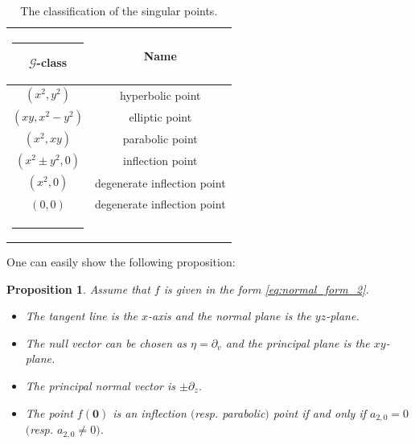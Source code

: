 \documentclass[12pt]{amsart}
\makeatletter
\theoremstyle{plain}
\newtheorem{proposition}[theorem]{Proposition}
\theoremstyle{definition}
\def\Bline{%
\noalign{\ifnum0=`}\fi\hrule \@height 1pt \futurelet
\reserved@a\@xhline}
\makeatother
\begin{document}
\begin{table}[ht!]
\centering
\caption{The classification of the singular points.}
\begin{tabular}{cc}
\Bline
$\mathcal{G}$-class & Name \\\hline
$(x^2,y^2)$ & hyperbolic point\\
$(x y,x^2-y^2)$ & elliptic point\\
$(x^2,x y)$ & parabolic point\\
$(x^2\pm y^2,0)$ & inflection point\\
$(x^2,0)$ & degenerate inflection point\\
$(0,0)$ & degenerate inflection point\\\Bline
\end{tabular}
\label{tab:singular_point}
\end{table}

 
One can easily show the following proposition:
\begin{proposition}
\label{prop:properties_of_normal_form} 
Assume that $f$ is given in the form \eqref{eq:normal_form_2}.
\begin{itemize}
\item 
The tangent line is the $x$-axis and the normal plane is the $y z$-plane. 

\item 
The null vector can be chosen as $\eta = \partial_v$ and the principal plane is the $x y$-plane. 

\item 
The principal normal vector is $\pm \partial_z$. 

\item 
The point $f(\bm{0})$ is an inflection $($resp. parabolic$)$ point if and only if $a_{2,0} = 0$ $($resp. $a_{2,0} \ne 0$$)$.
\end{itemize}
\end{proposition}
\end{document}

